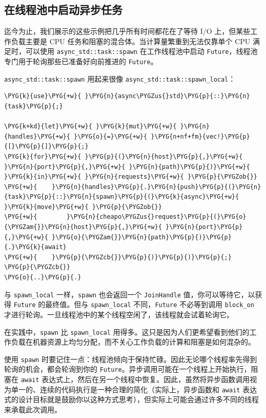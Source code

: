 \subsection{在线程池中启动异步任务}

迄今为止，我们展示的这些示例把几乎所有时间都花在了等待 I/O 上，但某些工作负载主要是 CPU 任务和阻塞的混合体。当计算量繁重到无法仅靠单个 CPU 满足时，可以使用 \texttt{async\_std::task::spawn} 在工作线程池中启动 \texttt{Future}，线程池专门用于轮询那些已准备好向前推进的 \texttt{Future}。

\texttt{async\_std::task::spawn} 用起来很像 \texttt{async\_std::task::spawn\_local}：

\begin{Verbatim}[commandchars=\\\{\},breaklines=true,breakanywhere=true,fontsize=\codefont,xleftmargin=17bp]
\PYG{k}{use}\PYG{+w}{ }\PYG{n}{async\PYGZus{}std}\PYG{p}{::}\PYG{n}{task}\PYG{p}{;}

\PYG{k+kd}{let}\PYG{+w}{ }\PYG{k}{mut}\PYG{+w}{ }\PYG{n}{handles}\PYG{+w}{ }\PYG{o}{=}\PYG{+w}{ }\PYG{n+nf+fm}{vec!}\PYG{p}{[}\PYG{p}{]}\PYG{p}{;}
\PYG{k}{for}\PYG{+w}{ }\PYG{p}{(}\PYG{n}{host}\PYG{p}{,}\PYG{+w}{ }\PYG{n}{port}\PYG{p}{,}\PYG{+w}{ }\PYG{n}{path}\PYG{p}{)}\PYG{+w}{ }\PYG{k}{in}\PYG{+w}{ }\PYG{n}{requests}\PYG{+w}{ }\PYG{p}{\PYGZob{}}
\PYG{+w}{    }\PYG{n}{handles}\PYG{p}{.}\PYG{n}{push}\PYG{p}{(}\PYG{n}{task}\PYG{p}{::}\PYG{n}{spawn}\PYG{p}{(}\PYG{k}{async}\PYG{+w}{ }\PYG{k}{move}\PYG{+w}{ }\PYG{p}{\PYGZob{}}
\PYG{+w}{        }\PYG{n}{cheapo\PYGZus{}request}\PYG{p}{(}\PYG{o}{\PYGZam{}}\PYG{n}{host}\PYG{p}{,}\PYG{+w}{ }\PYG{n}{port}\PYG{p}{,}\PYG{+w}{ }\PYG{o}{\PYGZam{}}\PYG{n}{path}\PYG{p}{)}\PYG{p}{.}\PYG{k}{await}
\PYG{+w}{    }\PYG{p}{\PYGZcb{}}\PYG{p}{)}\PYG{p}{)}\PYG{p}{;}
\PYG{p}{\PYGZcb{}}
\PYG{o}{..}\PYG{p}{.}
\end{Verbatim}

与 \texttt{spawn\_local} 一样，\texttt{spawn} 也会返回一个 \texttt{JoinHandle} 值，你可以等待它，以获得 \texttt{Future} 的最终值。但与 \texttt{spawn\_local} 不同，\texttt{Future} 不必等到调用 \texttt{block\_on} 才进行轮询。一旦线程池中的某个线程空闲了，该线程就会试着轮询它。

在实践中，\texttt{spawn} 比 \texttt{spawn\_local} 用得多。这只是因为人们更希望看到他们的工作负载在机器资源上均匀分配，而不关心工作负载的计算和阻塞是如何混杂的。

使用 \texttt{spawn} 时要记住一点：线程池倾向于保持忙碌。因此无论哪个线程率先得到轮询的机会，都会轮询到你的 \texttt{Future}。异步调用可能在一个线程上开始执行，阻塞在 \texttt{await} 表达式上，然后在另一个线程中恢复。因此，虽然将异步函数调用视为单一的、连续的代码执行是一种合理的简化（实际上，异步函数和 \texttt{await} 表达式的设计目标就是鼓励你以这种方式思考），但实际上可能会通过许多不同的线程来承载此次调用。

